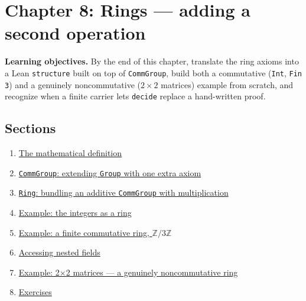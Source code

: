 \chapter{Chapter 8: Rings --- adding a second operation}\label{sec:08-rings:00-index:1}

\textbf{Learning objectives.} By the end of this chapter, translate the ring axioms into a Lean \texttt{structure} built on top of \texttt{CommGroup}, build both a commutative (\texttt{Int}, \texttt{Fin 3}) and a genuinely noncommutative (\(2\times 2\) matrices) example from scratch, and recognize when a finite carrier lets \texttt{decide} replace a hand-written proof.

\section{Sections}\label{sec:08-rings:00-index:2}

\begin{enumerate}
\def\labelenumi{\arabic{enumi}.}
\tightlist
\item
  \hyperref[sec:08-rings:01-definition:1]{The mathematical definition}
\item
  \hyperref[sec:08-rings:02-comm-group:1]{\texttt{CommGroup}: extending \texttt{Group} with one extra axiom}
\item
  \hyperref[sec:08-rings:03-ring:1]{\texttt{Ring}: bundling an additive \texttt{CommGroup} with multiplication}
\item
  \hyperref[sec:08-rings:04-integers-example:1]{Example: the integers as a ring}
\item
  \hyperref[sec:08-rings:05-finite-ring-example:1]{Example: a finite commutative ring, \(\mathbb{Z}/3\mathbb{Z}\)}
\item
  \hyperref[sec:08-rings:06-accessing-fields:1]{Accessing nested fields}
\item
  \hyperref[sec:08-rings:07-matrices:1]{Example: 2×2 matrices --- a genuinely noncommutative ring}
\item
  \hyperref[sec:08-rings:08-exercises:1]{Exercises}
\end{enumerate}









